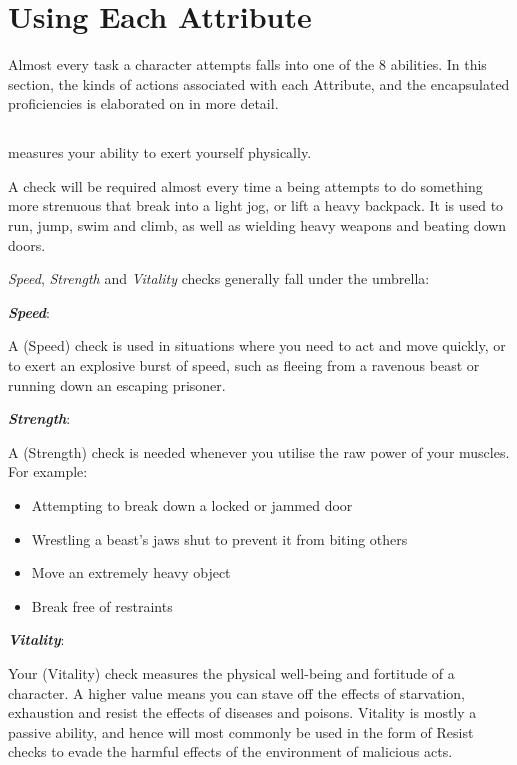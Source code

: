 \section{Using Each Attribute} \label{S:Proficiencies}

Almost every task a character attempts falls into one of the 8 abilities. In this section, the kinds of actions associated with each Attribute, and the encapsulated proficiencies is elaborated on in more detail. 


\def\itdef{\renewcommand\labelitemi{-}
\itemsep-0.5em}
\newcommand\proficiency[2]
{
	\textbf{\textit{#1}}: {\raggedright #2} 
}

\subsection{\attPhys{}}

\attPhys{} measures your ability to exert yourself physically. 


A \attPhys{} check will be required almost every time a being attempts to do something more strenuous that break into a light jog, or lift a heavy backpack. It is used to run, jump, swim and climb, as well as wielding heavy weapons and beating down doors. 

{\it Speed}, {\it Strength} and {\it Vitality} checks generally fall under the \attPhys{} umbrella:

\proficiency{Speed}{A \attPhys{} (Speed) check is used in situations where you need to act and move quickly, or to exert an explosive burst of speed, such as fleeing from a ravenous beast or running down an escaping prisoner. }

\proficiency{Strength}{A \attPhys{} (Strength) check is needed whenever you utilise the raw power of your muscles. For example: 
\begin{itemize}
\itdef
\item Attempting to break down a locked or jammed door
\item Wrestling a beast's jaws shut to prevent it from biting others
\item Move an extremely heavy object 
\item Break free of restraints
\end{itemize}
}

\proficiency{Vitality}{Your \attPhys{} (Vitality) check measures the physical well-being and fortitude of a character. A higher value means you can stave off the effects of starvation, exhaustion and resist the effects of diseases and poisons. Vitality is mostly a passive ability, and hence will most commonly be used in the form of Resist checks to evade the harmful effects of the environment of malicious acts. }

